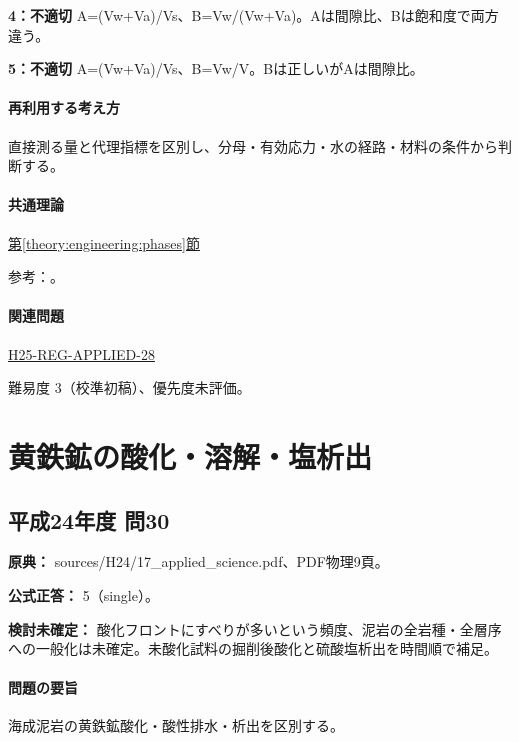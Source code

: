 \noindent\textbf{4：不適切} A=\allowbreak{}(Vw+Va)/Vs、B=\allowbreak{}Vw/(Vw+Va)。Aは間隙比、Bは飽和度で両方違う。\par

\noindent\textbf{5：不適切} A=\allowbreak{}(Vw+Va)/Vs、B=\allowbreak{}Vw/V。Bは正しいがAは間隙比。\par

\paragraph{再利用する考え方} 直接測る量と代理指標を区別し、分母・有効応力・水の経路・材料の条件から判断する。

\paragraph{共通理論} \hyperref[theory:engineering:phases]{第\ref*{theory:engineering:phases}節}

\par 参考：\cite{eng52_soil_phases}。

\paragraph{関連問題} \hyperref[q:h25-reg-applied-28]{H25-REG-APPLIED-28}

\par 難易度 3（校準初稿）、優先度未評価。

\section{黄鉄鉱の酸化・溶解・塩析出}

\subsection{平成24年度 問30}
\label{q:h24-reg-applied-30}

\noindent\textbf{原典：} sources/H24/17\_applied\_science.pdf、PDF物理9頁。

\textbf{公式正答：} 5（single）。

\par\textbf{検討未確定：} 酸化フロントにすべりが多いという頻度、泥岩の全岩種・全層序への一般化は未確定。未酸化試料の掘削後酸化と硫酸塩析出を時間順で補足。

\paragraph{問題の要旨} 海成泥岩の黄鉄鉱酸化・酸性排水・析出を区別する。


